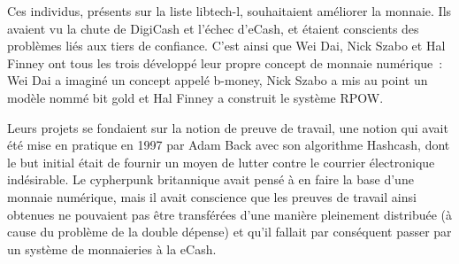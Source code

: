 Ces individus, présents sur la liste libtech-l, souhaitaient améliorer la monnaie. Ils avaient vu la chute de DigiCash et l'échec d'eCash, et étaient conscients des problèmes liés aux tiers de confiance. C'est ainsi que Wei Dai, Nick Szabo et Hal Finney ont tous les trois développé leur propre concept de monnaie numérique~: Wei Dai a imaginé un concept appelé b-money, Nick Szabo a mis au point un modèle nommé bit gold et Hal Finney a construit le système RPOW.

Leurs projets se fondaient sur la notion de preuve de travail, une notion qui avait été mise en pratique en 1997 par Adam Back avec son algorithme Hashcash, dont le but initial était de fournir un moyen de lutter contre le courrier électronique indésirable. Le cypherpunk britannique avait pensé à en faire la base d'une monnaie numérique, mais il avait conscience que les preuves de travail ainsi obtenues ne pouvaient pas être transférées d'une manière pleinement distribuée (à cause du problème de la double dépense) et qu'il fallait par conséquent passer par un système de monnaieries à la eCash. %
%
